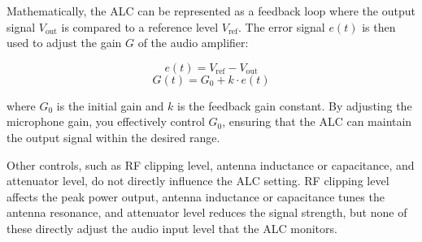 Mathematically, the ALC can be represented as a feedback loop where the output signal \( V_{\text{out}} \) is compared to a reference level \( V_{\text{ref}} \). The error signal \( e(t) \) is then used to adjust the gain \( G \) of the audio amplifier:

\[
e(t) = V_{\text{ref}} - V_{\text{out}}
\]
\[
G(t) = G_0 + k \cdot e(t)
\]

where \( G_0 \) is the initial gain and \( k \) is the feedback gain constant. By adjusting the microphone gain, you effectively control \( G_0 \), ensuring that the ALC can maintain the output signal within the desired range.

Other controls, such as RF clipping level, antenna inductance or capacitance, and attenuator level, do not directly influence the ALC setting. RF clipping level affects the peak power output, antenna inductance or capacitance tunes the antenna resonance, and attenuator level reduces the signal strength, but none of these directly adjust the audio input level that the ALC monitors.

